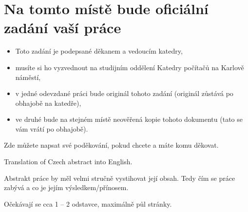 \documentclass[11pt,twoside,a4paper]{book}
\begin{document}
	\translate				%

	{
	 \cleardoublepage \thispagestyle{empty}
	\chapter*{Na tomto místě bude oficiální zadání vaší práce}
	\begin{itemize}
		\item Toto zadání je podepsané děkanem a vedoucím katedry,
		\item musíte si ho vyzvednout na studijním oddělení Katedry počítačů na Karlově náměstí,
		\item v jedné odevzdané práci bude originál tohoto zadání (originál zůstává po obhajobě na katedře),
		\item ve druhé bude na stejném místě neověřená kopie tohoto dokumentu (tato se vám vrátí po obhajobě).
	\end{itemize}
	\newpage
	}

	\coverpagestarts


	\acknowledgements
	\noindent
	Zde můžete napsat své poděkování, pokud chcete a máte komu děkovat.




	\abstractpage

	Translation of Czech abstract into English.


	\baselineskip

	\noindent
	Abstrakt práce by měl velmi stručně vystihovat její obsah. Tedy čím se práce zabývá a co je jejím výsledkem/přínosem.

	\noindent
	Očekávají se cca 1 -- 2 odstavce, maximálně půl stránky.
\end{document}
